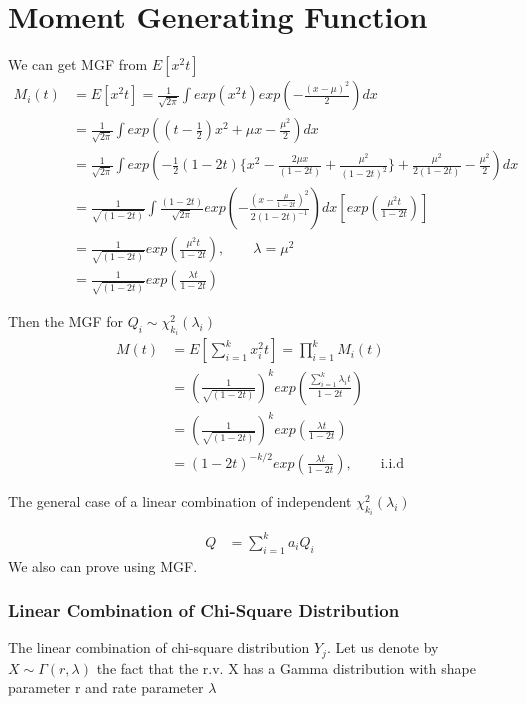 \documentclass[11pt]{article} %
\begin{document}
\section{Moment Generating Function}
We can get MGF from $E[x^2 t]$
\begin{align*}
	M_i(t) &= E[x^2 t] = \frac{1}{\sqrt{2\pi}} \int exp(x^2 t) exp \left( - \frac{(x-\mu)^2}{2} \right) dx\\
	&=  \frac{1}{\sqrt{2\pi}}  \int exp \left( (t- \frac{1}{2}) x^2 + \mu x -\frac{\mu^2}{2} \right) dx \\
	&=  \frac{1}{\sqrt{2\pi}}  \int exp \left(  -\frac{1}{2}(1-2t) \{ x^2 - \frac{2 \mu x}{(1-2t)} + \frac{\mu^2}{(1-2t)^2} \} + \frac{\mu^2}{2(1-2t)} -\frac{\mu^2}{2}  \right) dx \\
	&= \frac{1}{\sqrt{(1-2t)}} \int \frac{(1-2t)}{\sqrt{2\pi}} exp\left( -\frac{(x-\frac{\mu}{1-2t})^2}{2 (1-2t)^{-1}} \right) dx \left[exp \left( \frac{\mu^2 t}{1-2t} \right) \right]\\
	&=\frac{1}{\sqrt{(1-2t)}} exp \left( \frac{\mu^2 t}{1-2t} \right), \qquad \lambda = \mu^2\\
	&=\frac{1}{\sqrt{(1-2t)}} exp \left( \frac{\lambda t}{1-2t} \right)
\end{align*}

Then the MGF for $Q_i \sim \chi^2 _{k_i}(\lambda_i)$
\begin{align*}
	M(t) &= E[ \sum_{i=1}^k x_i^2 t] = \prod_{i=1}^k M_i(t) \\
	&=\left(\frac{1}{\sqrt{(1-2t)}} \right)^k exp \left( \frac{ \sum_{i=1}^k \lambda_i t }{1-2t} \right)\\
	&=\left(\frac{1}{\sqrt{(1-2t)}} \right)^k exp \left( \frac{ \lambda t }{1-2t} \right)\\
	&= (1-2t)^{-k/2} exp \left( \frac{ \lambda t }{1-2t} \right), \qquad \text{i.i.d}
\end{align*}

The general case of a linear combination of independent $\chi^2_{k_i}(\lambda_i)$

\begin{align*}
	Q &= \sum_{i=1}^k a_i Q_i
\end{align*}
We also can prove using MGF.

\subsubsection{Linear Combination of Chi-Square Distribution}
The linear combination of chi-square distribution $Y_j$. Let us denote by $X \sim \Gamma(r, \lambda)$ the fact that the r.v. X has a Gamma distribution with shape parameter r and rate parameter $\lambda$ 
\end{document}
